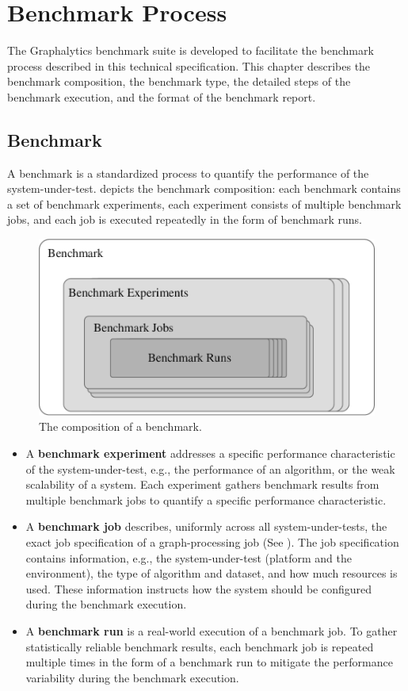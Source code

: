 \chapter{Benchmark Process}
\label{chap:benchmark_process}
The Graphalytics benchmark suite is developed to facilitate the benchmark process described in this technical specification. This chapter describes the benchmark composition, the benchmark type, the detailed steps of the benchmark execution, and the format of the benchmark report. 


\section{Benchmark}
\label{sec:process:benchmark}
A benchmark is a standardized process to quantify the performance of the system-under-test.  depicts the benchmark composition: each benchmark contains a set of benchmark experiments, each experiment consists of multiple benchmark jobs, and each job is executed repeatedly in the form of benchmark runs.

\begin{figure}[h]
	\centering
	\includegraphics[width=0.6\linewidth]{figures/benchmark-composition.pdf}
	\caption{The composition of a benchmark.}
	\label{fig:benchmark_composition}
\end{figure}

\begin{itemize}
    \item A \textbf{benchmark experiment} addresses a specific performance characteristic of the system-under-test, e.g., the performance of an algorithm, or the weak scalability of a system. Each experiment gathers benchmark results from multiple benchmark jobs to quantify a specific performance characteristic.
    
    \item A \textbf{benchmark job} describes, uniformly across all system-under-tests, the exact job specification of a graph-processing job (See ). The job specification contains information, e.g., the system-under-test (platform and the environment), the type of algorithm and dataset, and how much resources is used. These information instructs how the system should be configured during the benchmark execution.
    
    \item A \textbf{benchmark run} is a real-world execution of a benchmark job. To gather statistically reliable benchmark results, each benchmark job is repeated multiple times in the form of a benchmark run to mitigate the performance variability during the benchmark execution. 
\end{itemize}




